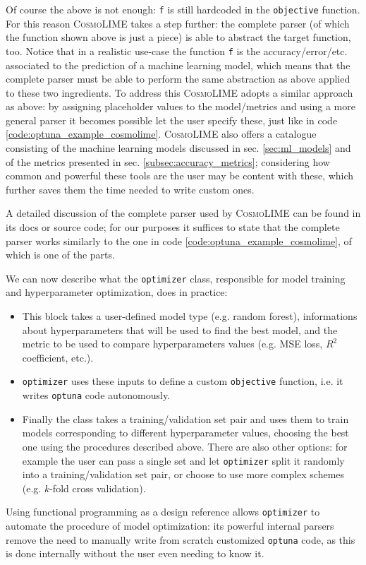 Of course the above is not enough: \texttt{f} is still hardcoded in the \texttt{objective} function. For this reason \textsc{CosmoLIME} takes a step further: the complete parser (of which the function shown above is just a piece) is able to abstract the target function, too. 
Notice that in a realistic use-case the function \texttt{f} is the accuracy/error/etc. associated to the prediction of a machine learning model, which means that the complete parser must be able to perform the same abstraction as above applied to these two ingredients. 
To address this \textsc{CosmoLIME} adopts a similar approach as above: by assigning placeholder values to the model/metrics and using a more general parser it becomes possible let the user specify these, just like in code \ref{code:optuna_example_cosmolime}. \textsc{CosmoLIME} also offers a catalogue consisting of the machine learning models discussed in sec. \ref{sec:ml_models} and of the metrics presented in sec. \ref{subsec:accuracy_metrics}; considering how common and powerful these tools are the user may be content with these, which further saves them the time needed to write custom ones.

A detailed discussion of the complete parser used by \textsc{CosmoLIME} can be found in its docs or source code; for our purposes it suffices to state that the complete parser works similarly to the one in code \ref{code:optuna_example_cosmolime}, of which is one of the parts.

We can now describe what the \texttt{optimizer} class, responsible for model training and hyperparameter optimization, does in practice:
\begin{itemize}
    \item This block takes a user-defined model type (e.g. random forest), informations about hyperparameters that will be used to find the best model, and the metric to be used to compare hyperparameters values (e.g. MSE loss, $R^2$ coefficient, etc.).
    \item \texttt{optimizer} uses these inputs to define a custom \texttt{objective} function, i.e. it writes \texttt{optuna} code autonomously.
    \item Finally the class takes a training/validation set pair and uses them to train models corresponding to different hyperparameter values, choosing the best one using the procedures described above. There are also other options: for example the user can pass a single set and let \texttt{optimizer} split it randomly into a training/validation set pair, or choose to use more complex schemes (e.g. $k$-fold cross validation).
\end{itemize}
Using functional programming as a design reference allows \texttt{optimizer} to automate the procedure of model optimization: its powerful internal parsers remove the need to manually write from scratch customized \texttt{optuna} code, as this is done internally without the user even needing to know it.

